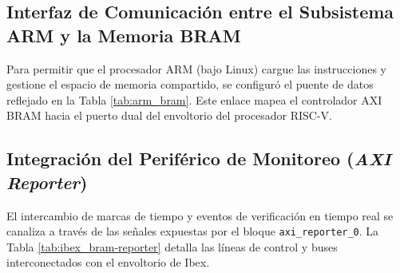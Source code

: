 \subsection{Interfaz de Comunicación entre el Subsistema ARM y la Memoria BRAM}
Para permitir que el procesador ARM (bajo Linux) cargue las instrucciones y gestione el espacio de memoria compartido, se configuró el puente de datos reflejado en la Tabla \ref{tab:arm_bram}. Este enlace mapea el controlador AXI BRAM hacia el puerto dual del envoltorio del procesador RISC-V.


\subsection{Integración del Periférico de Monitoreo (\textit{AXI Reporter})}
El intercambio de marcas de tiempo y eventos de verificación en tiempo real se canaliza a través de las señales expuestas por el bloque \texttt{axi\_reporter\_0}. La Tabla \ref{tab:ibex_bram-reporter} detalla las líneas de control y buses interconectados con el envoltorio de Ibex.

